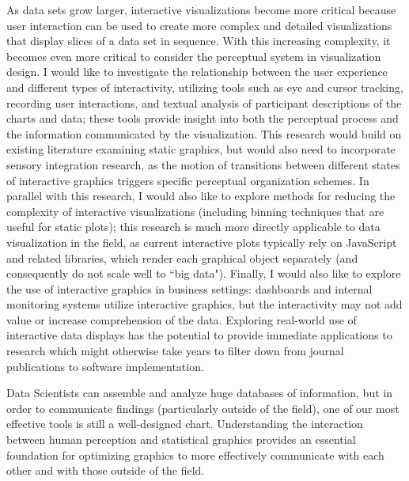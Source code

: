 \documentclass[12pt, letterpaper, sans]{moderncv}
\begin{document}
\vspace{.5cm}\hspace{8pt} As data sets grow larger, interactive visualizations become more critical because user interaction can be used to create more complex and detailed visualizations that display slices of a data set in sequence. With this increasing complexity, it becomes even more critical to consider the perceptual system in visualization design. I would like to investigate the relationship between the user experience and different types of interactivity, utilizing tools such as eye and cursor tracking, recording user interactions, and textual analysis of participant descriptions of the charts and data; these tools provide insight into both the perceptual process and the information communicated by the visualization. This research would build on existing literature examining static graphics, but would also need to incorporate sensory integration research, as the motion of transitions between different states of interactive graphics triggers specific perceptual organization schemes. In parallel with this research, I would also like to explore methods for reducing the complexity of interactive visualizations (including binning techniques that are useful for static plots); this research is much more directly applicable to data visualization in the field, as current interactive plots typically rely on JavaScript and related libraries, which render each graphical object separately (and consequently do not scale well to ``big data"). Finally, I would also like to explore the use of interactive graphics in business settings: dashboards and internal monitoring systems utilize interactive graphics, but the interactivity may not add value or increase comprehension of the data. Exploring real-world use of interactive data displays has the potential to provide immediate applications to research which might otherwise take years to filter down from journal publications to software implementation.


\vspace{.5cm}Data Scientists can assemble and analyze huge databases of information, but in order to communicate findings (particularly outside of the field), one of our most effective tools is still a well-designed chart. Understanding the interaction between human perception and statistical graphics provides an essential foundation for optimizing graphics to more effectively communicate with each other and with those outside of the field.
\end{document}
